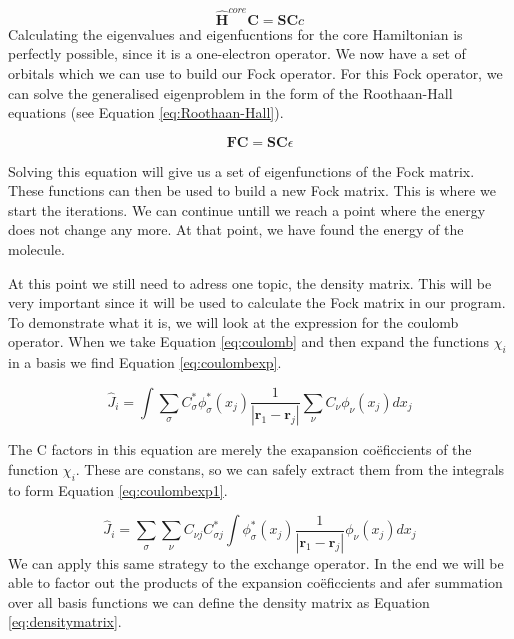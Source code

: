 \begin{equation}\label{eq:eigenproblem}
    \boldsymbol{\hat{H}}^{core}\boldsymbol{C} = \boldsymbol{SC}c
\end{equation} 
Calculating the eigenvalues and eigenfucntions for the core Hamiltonian is 
perfectly possible, since it is a one-electron operator. We now have a set of 
orbitals which we can use to build our Fock operator. For this Fock operator, 
we can solve the generalised eigenproblem in the form of the Roothaan-Hall 
equations (see Equation \ref{eq:Roothaan-Hall}).

\begin{equation}\label{eq:Roothaan-Hall}
    \boldsymbol{FC} = \boldsymbol{SC}\epsilon
\end{equation}

Solving this equation will give us a set of eigenfunctions of the Fock matrix. 
These functions can then be used to build a new Fock matrix. This is where we 
start the iterations. We can continue untill we reach a point where the energy 
does not change any more. At that point, we have found the energy of the molecule.

At this point we still need to adress one topic, the density matrix. This will be
very important since it will be used to calculate the Fock matrix in our program.
To demonstrate what it is, we will look at the expression for the coulomb operator.
When we take Equation \ref{eq:coulomb} and then expand the functions $\chi_i$ in
a basis we find Equation \ref{eq:coulombexp}.

\begin{equation}\label{eq:coulombexp}
    \hat{J}_i = \int\sum_{\sigma}C^*_{\sigma}\phi^*_{\sigma}(x_j)\frac{1}{|\boldsymbol{r}_1 - \boldsymbol{r}_j|}\sum_{\nu}C_{\nu}\phi_{\nu}(x_j)dx_j
\end{equation}

The C factors in this equation are merely the exapansion coëficcients of the function
$\chi_i$. These are constans, so we can safely extract them from the integrals to form
Equation \ref{eq:coulombexp1}.

\begin{equation}\label{eq:coulombexp1}
    \hat{J}_i = \sum_{\sigma}\sum_{\nu}C_{\nu j}C^*_{\sigma j}\int\phi^*_{\sigma}(x_j)\frac{1}{|\boldsymbol{r}_1 - \boldsymbol{r}_j|}\phi_{\nu}(x_j)dx_j
\end{equation}
We can apply this same strategy to the exchange operator. In the end we will be
able to factor out the products of the expansion coëficcients and afer summation
over all basis functions we can define the density matrix as Equation 
\ref{eq:densitymatrix}.

